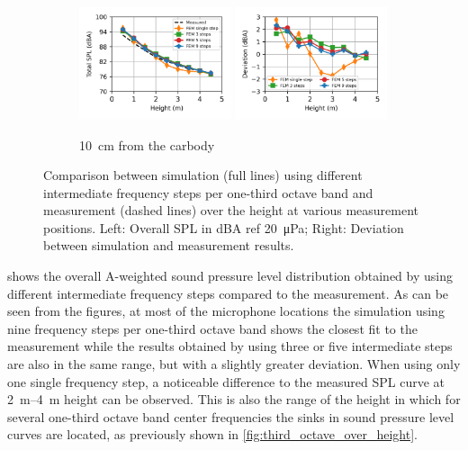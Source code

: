 \begin{figure}
	\begin{subfigure}[b]{\textwidth}
		\centering
		\includegraphics[width=0.49\textwidth]{fig/chap5/freq_steps/overall_SPL/pos_f.png}
		\includegraphics[width=0.49\textwidth]{fig/chap5/freq_steps/overall_SPL/pos_f_deviation.png}
		\caption{\SI{10}{\centi\meter} from the carbody}
	\end{subfigure}
	\caption{Comparison between simulation (full lines) using different intermediate frequency steps per one-third octave band and measurement (dashed lines) over the height at various measurement positions. Left: Overall SPL in dBA ref \SI{20}{\micro\pascal}; Right: Deviation between simulation and measurement results.}
	\label{fig:overall_SPL_freq_steps}
\end{figure}

 shows the overall A-weighted sound pressure level distribution obtained by using different intermediate frequency steps compared to the measurement.
As can be seen from the figures, at most of the microphone locations the simulation using nine frequency steps per one-third octave band shows the closest fit to the measurement while the results obtained by using three or five intermediate steps are also in the same range, but with a slightly greater deviation.
When using only one single frequency step, a noticeable difference to the measured SPL curve at \SIrange{2}{4}{\meter} height can be observed. This is also the range of the height in which for several one-third octave band center frequencies the sinks in sound pressure level curves are located, as previously shown in \cref{fig:third_octave_over_height}.

